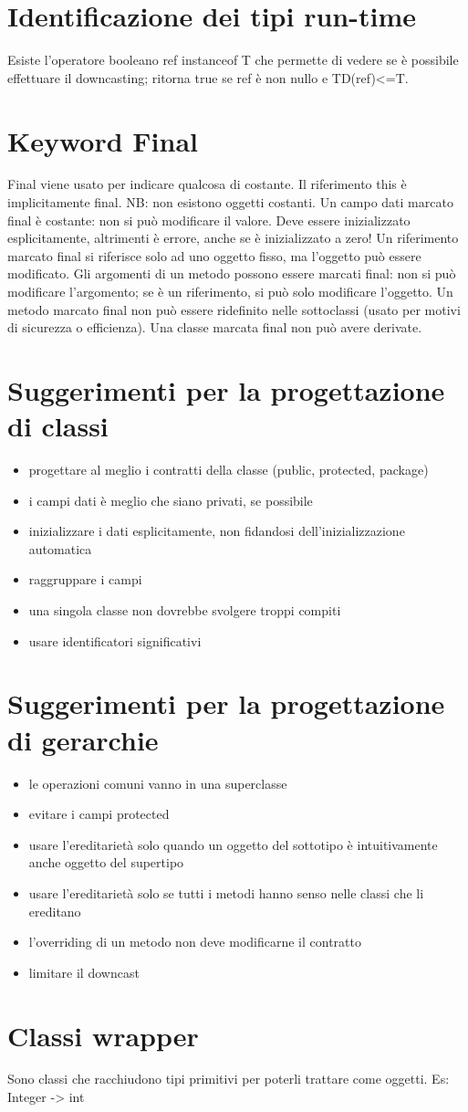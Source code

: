 \section{Identificazione dei tipi run-time}
Esiste l'operatore booleano ref instanceof T che permette di vedere se è possibile effettuare il downcasting; ritorna true se ref è non nullo e TD(ref)<=T.

\section{Keyword Final}
Final viene usato per indicare qualcosa di costante. Il riferimento this è implicitamente final.
NB: non esistono oggetti costanti.
Un campo dati marcato final è costante: non si può modificare il valore. Deve essere inizializzato esplicitamente, altrimenti è errore, anche se è inizializzato a zero!
Un riferimento marcato final si riferisce solo ad uno oggetto fisso, ma l'oggetto può essere modificato.
Gli argomenti di un metodo possono essere marcati final: non si può modificare l'argomento; se è un riferimento, si può solo modificare l'oggetto.
Un metodo marcato final non può essere ridefinito nelle sottoclassi (usato per motivi di sicurezza o efficienza).
Una classe marcata final non può avere derivate.

\section{Suggerimenti per la progettazione di classi}
\begin{itemize}
\item progettare al meglio i contratti della classe (public, protected, package)
\item i campi dati è meglio che siano privati, se possibile
\item inizializzare i dati esplicitamente, non fidandosi dell'inizializzazione automatica
\item raggruppare i campi
\item una singola classe non dovrebbe svolgere troppi compiti
\item usare identificatori significativi
\end{itemize}

\section{Suggerimenti per la progettazione di gerarchie}
\begin{itemize}
\item le operazioni comuni vanno in una superclasse
\item evitare i campi protected
\item usare l'ereditarietà solo quando un oggetto del sottotipo è intuitivamente anche oggetto del supertipo
\item usare l'ereditarietà solo se tutti i metodi hanno senso nelle classi che li ereditano
\item l'overriding di un metodo non deve modificarne il contratto
\item limitare il downcast
\end{itemize}

\section{Classi wrapper}
Sono classi che racchiudono tipi primitivi per poterli trattare come oggetti. Es: Integer -> int

